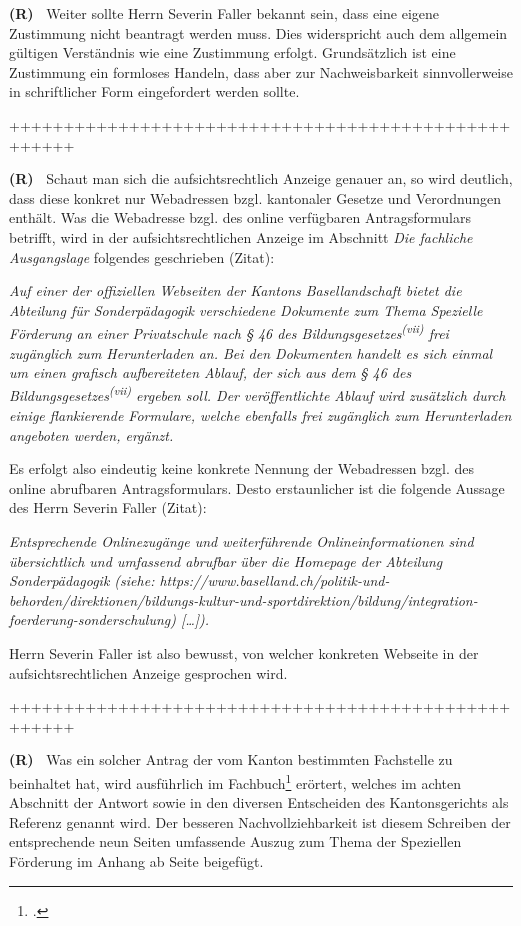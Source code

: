 \documentclass[paper=a4,fontsize=12pt, oneside, numbers=noenddot]{scrbook}
\newcounter{rz}
\newcommand{\Rz}{
	\addtocounter{rz}{1}\textbf{(R\arabic{rz})~}
}
\newcommand{\RzLabel}[1]{
	\refstepcounter{rz}\label{#1}\textbf{(R\arabic{rz})~}
}
\begin{document}
\Rz Weiter sollte Herrn Severin Faller bekannt sein, dass eine eigene Zustimmung nicht beantragt werden muss. Dies widerspricht auch dem allgemein gültigen Verständnis wie eine Zustimmung erfolgt. Grundsätzlich ist eine Zustimmung ein formloses Handeln, dass aber zur Nachweisbarkeit sinnvollerweise in schriftlicher Form eingefordert werden sollte. 

++++++++++++++++++++++++++++++++++++++++++++++++++++

\RzLabel{WebseiteBekannt} Schaut man sich die aufsichtsrechtlich Anzeige genauer an, so wird deutlich, dass diese konkret nur Webadressen bzgl. kantonaler Gesetze und Verordnungen enthält. Was die Webadresse bzgl. des online verfügbaren Antragsformulars betrifft, wird in der aufsichtsrechtlichen Anzeige im Abschnitt \textit{Die fachliche Ausgangslage} folgendes geschrieben (Zitat):
\begin{addmargin}[2.5em]{0em}\emph{Auf einer der offiziellen Webseiten der Kantons Basellandschaft bietet die Abteilung für	Sonderpädagogik verschiedene Dokumente zum Thema Spezielle Förderung an einer Privatschule nach § 46 des Bildungsgesetzes\textsuperscript{(vii)} frei zugänglich zum Herunterladen an. Bei den Dokumenten handelt es sich einmal um einen grafisch aufbereiteten Ablauf, der sich aus dem § 46 des Bildungsgesetzes\textsuperscript{(vii)} ergeben soll. Der veröffentlichte Ablauf wird zusätzlich durch einige flankierende Formulare, welche ebenfalls frei zugänglich zum Herunterladen angeboten werden, ergänzt.}
\end{addmargin}
Es erfolgt also eindeutig keine konkrete Nennung der Webadressen bzgl. des online abrufbaren Antragsformulars. Desto erstaunlicher ist die folgende Aussage des Herrn Severin Faller (Zitat):

\begin{addmargin}[2.5em]{0em}\emph{Entsprechende Onlinezugänge und weiterführende Onlineinformationen sind übersichtlich und umfassend abrufbar über die Homepage der Abteilung Sonderpädagogik (siehe: https://www.baselland.ch/politik-und-behorden/direktionen/bildungs-kultur-und-sportdirektion/bildung/integration-foerderung-sonderschulung) [\dots]).
}\end{addmargin}
Herrn Severin Faller ist also bewusst, von welcher konkreten Webseite in der aufsichtsrechtlichen Anzeige gesprochen wird.


++++++++++++++++++++++++++++++++++++++++++++++++++++



\RzLabel{InhaltAntrag} Was ein solcher Antrag der vom Kanton bestimmten Fachstelle zu beinhaltet hat, wird ausführlich im Fachbuch\footcite[Seite 49]{2007:Biaggini:StaatsVerwaltungsrechBL} erörtert, welches im achten Abschnitt der Antwort sowie in den diversen Entscheiden des Kantonsgerichts als Referenz genannt wird. Der besseren Nachvollziehbarkeit ist diesem Schreiben der entsprechende neun Seiten umfassende Auszug zum Thema der Speziellen Förderung im Anhang ab Seite \pageref{AuszugVerwaltungsrechtII} beigefügt. 
\end{document}

